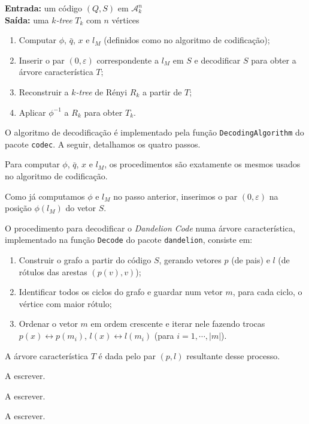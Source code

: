 \begin{algorithm}
  \textbf{Entrada:} um código $(Q, S)$ em $\mathcal{A}^n_k$\\
  \textbf{Saída:} uma \emph{$k$-tree} $T_k$ com $n$ vértices

  \begin{enumerate}
    \item Computar $\phi$, $\bar{q}$, $x$ e $l_M$ (definidos como no algoritmo de codificação);
    \item Inserir o par $(0, \varepsilon)$ correspondente a $l_M$ em $S$ e decodificar $S$ para obter a árvore característica $T$;
    \item Reconstruir a \emph{$k$-tree} de Rényi $R_k$ a partir de $T$;
    \item Aplicar $\phi^{-1}$ a $R_k$ para obter $T_k$.
  \end{enumerate}

  O algoritmo de decodificação é implementado pela função {\tt DecodingAlgorithm} do pacote {\tt codec}. A seguir, detalhamos os quatro passos.

  \setcounter{step}{0}

  \begin{step}
    Para computar $\phi$, $\bar{q}$, $x$ e $l_M$, os procedimentos são exatamente os mesmos usados no algoritmo de codificação.
  \end{step}

  \begin{step}
    Como já computamos $\phi$ e $l_M$ no passo anterior, inserimos o par $(0, \varepsilon)$ na posição $\phi(l_M)$ do vetor $S$.

    O procedimento para decodificar o \emph{Dandelion Code} numa árvore característica, implementado na função {\tt Decode} do pacote {\tt dandelion}, consiste em:

    \begin{enumerate}
      \item Construir o grafo a partir do código $S$, gerando vetores $p$ (de pais) e $l$ (de rótulos das arestas $(p(v), v)$);
      \item Identificar todos os ciclos do grafo e guardar num vetor $m$, para cada ciclo, o vértice com maior rótulo;
      \item Ordenar o vetor $m$ em ordem crescente e iterar nele fazendo trocas $p(x) \leftrightarrow p(m_i)$, $l(x) \leftrightarrow l(m_i)$ (para $i = 1, \cdots, |m|$).
    \end{enumerate}

    A árvore característica $T$ é dada pelo par $(p, l)$ resultante desse processo.
  \end{step}

  \begin{step}
    A escrever. %
  \end{step}

  \begin{step}
    A escrever. %
  \end{step}

  A escrever. %
\end{algorithm}

